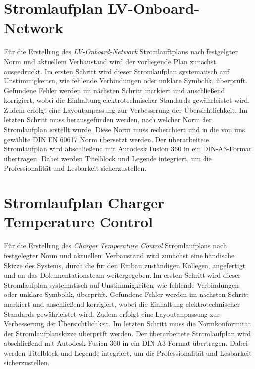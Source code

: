 \section*{Stromlaufplan LV-Onboard-Network}
Für die Erstellung des \textit{LV-Onboard-Network} Stromlauftplans nach festgelgter Norm und aktuellem Verbaustand wird der vorliegende Plan zunächst ausgedruckt. Im ersten Schritt wird dieser Stromlaufplan systematisch auf Unstimmigkeiten, wie fehlende Verbindungen oder unklare Symbolik, überprüft. Gefundene Fehler werden im nächsten Schritt markiert und anschließend korrigiert, wobei die Einhaltung elektrotechnischer Standards gewährleistet wird. Zudem erfolgt eine Layoutanpassung zur Verbesserung der Übersichtlichkeit. Im letzten Schritt muss herausgefunden werden, nach welcher Norm der Stromlaufplan erstellt wurde. Diese Norm muss recherchiert und in die von uns gewählte DIN EN 60617 Norm \glqq übersetzt\grqq {} werden. Der überarbeitete Stromlaufplan wird abschließend mit Autodesk Fusion 360 in ein DIN-A3-Format übertragen. Dabei werden Titelblock und Legende integriert, um die Professionalität und Lesbarkeit sicherzustellen. 
 
\addtocounter{page}{1} 
\section*{Stromlaufplan Charger Temperature Control}
Für die Erstellung des \textit{Charger Temperature Control} Stromlaufplans nach festgelegter Norm und aktuellem Verbaustand wird zunächst eine händische Skizze des Systems, durch die für den Einbau zuständigen Kollegen, angefertigt und an das Dokumentationsteam weitergegeben. Im ersten Schritt wird dieser Stromlaufplan systematisch auf Unstimmigkeiten, wie fehlende Verbindungen oder unklare Symbolik, überprüft. Gefundene Fehler werden im nächsten Schritt markiert und anschließend korrigiert, wobei die Einhaltung elektrotechnischer Standards gewährleistet wird. Zudem erfolgt eine Layoutanpassung zur Verbesserung der Übersichtlichkeit. Im letzten Schritt muss die Normkonformität der Stromlaufplanskizze überprüft werden. Der überarbeitete Stromlaufplan wird abschließend mit Autodesk Fusion 360 in ein DIN-A3-Format übertragen. Dabei werden Titelblock und Legende integriert, um die Professionalität und Lesbarkeit sicherzustellen. 


